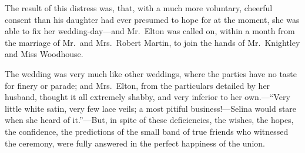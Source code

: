 The result of this distress was, that, with a much more voluntary,
cheerful consent than his daughter had ever presumed to hope for at
the moment, she was able to fix her wedding-day---and Mr.\ Elton was
called on, within a month from the marriage of Mr.\ and Mrs.\ Robert
Martin, to join the hands of Mr.\ Knightley and Miss Woodhouse.

The wedding was very much like other weddings, where the parties
have no taste for finery or parade; and Mrs.\ Elton, from the
particulars detailed by her husband, thought it all extremely shabby,
and very inferior to her own.---``Very little white satin, very few
lace veils; a most pitiful business!---Selina would stare when she
heard of it.''---But, in spite of these deficiencies, the wishes,
the hopes, the confidence, the predictions of the small band
of true friends who witnessed the ceremony, were fully answered
in the perfect happiness of the union.



% 
% 
